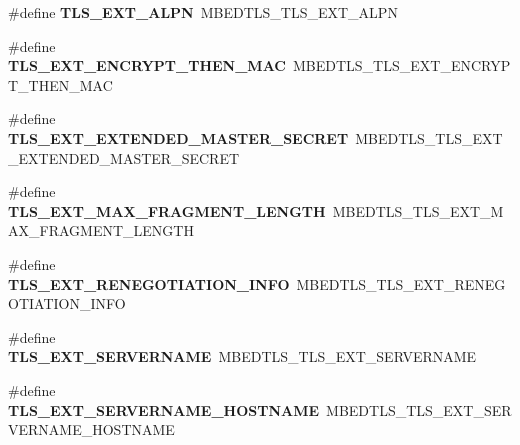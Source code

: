 \begin{DoxyCompactItemize}
\item 
\mbox{\label{compat-1_83_8h_a4b91900b335587d00420ed5a48e88e7d}} 
\#define {\bfseries T\+L\+S\+\_\+\+E\+X\+T\+\_\+\+A\+L\+PN}~M\+B\+E\+D\+T\+L\+S\+\_\+\+T\+L\+S\+\_\+\+E\+X\+T\+\_\+\+A\+L\+PN
\item 
\mbox{\label{compat-1_83_8h_ae136afe82bd9031a4c1c604de0cb0118}} 
\#define {\bfseries T\+L\+S\+\_\+\+E\+X\+T\+\_\+\+E\+N\+C\+R\+Y\+P\+T\+\_\+\+T\+H\+E\+N\+\_\+\+M\+AC}~M\+B\+E\+D\+T\+L\+S\+\_\+\+T\+L\+S\+\_\+\+E\+X\+T\+\_\+\+E\+N\+C\+R\+Y\+P\+T\+\_\+\+T\+H\+E\+N\+\_\+\+M\+AC
\item 
\mbox{\label{compat-1_83_8h_ac9dee2d05752c1b5385cabd27bd0beb4}} 
\#define {\bfseries T\+L\+S\+\_\+\+E\+X\+T\+\_\+\+E\+X\+T\+E\+N\+D\+E\+D\+\_\+\+M\+A\+S\+T\+E\+R\+\_\+\+S\+E\+C\+R\+ET}~M\+B\+E\+D\+T\+L\+S\+\_\+\+T\+L\+S\+\_\+\+E\+X\+T\+\_\+\+E\+X\+T\+E\+N\+D\+E\+D\+\_\+\+M\+A\+S\+T\+E\+R\+\_\+\+S\+E\+C\+R\+ET
\item 
\mbox{\label{compat-1_83_8h_aa7408a3622ebe264a5ef2c105a964cbd}} 
\#define {\bfseries T\+L\+S\+\_\+\+E\+X\+T\+\_\+\+M\+A\+X\+\_\+\+F\+R\+A\+G\+M\+E\+N\+T\+\_\+\+L\+E\+N\+G\+TH}~M\+B\+E\+D\+T\+L\+S\+\_\+\+T\+L\+S\+\_\+\+E\+X\+T\+\_\+\+M\+A\+X\+\_\+\+F\+R\+A\+G\+M\+E\+N\+T\+\_\+\+L\+E\+N\+G\+TH
\item 
\mbox{\label{compat-1_83_8h_ad0fbdb0804151f3a00631c342cf65957}} 
\#define {\bfseries T\+L\+S\+\_\+\+E\+X\+T\+\_\+\+R\+E\+N\+E\+G\+O\+T\+I\+A\+T\+I\+O\+N\+\_\+\+I\+N\+FO}~M\+B\+E\+D\+T\+L\+S\+\_\+\+T\+L\+S\+\_\+\+E\+X\+T\+\_\+\+R\+E\+N\+E\+G\+O\+T\+I\+A\+T\+I\+O\+N\+\_\+\+I\+N\+FO
\item 
\mbox{\label{compat-1_83_8h_a21bb5a4f093a191a4e3f0efae924dd7c}} 
\#define {\bfseries T\+L\+S\+\_\+\+E\+X\+T\+\_\+\+S\+E\+R\+V\+E\+R\+N\+A\+ME}~M\+B\+E\+D\+T\+L\+S\+\_\+\+T\+L\+S\+\_\+\+E\+X\+T\+\_\+\+S\+E\+R\+V\+E\+R\+N\+A\+ME
\item 
\mbox{\label{compat-1_83_8h_a948d249c0b07844056fdf68c640bb2ca}} 
\#define {\bfseries T\+L\+S\+\_\+\+E\+X\+T\+\_\+\+S\+E\+R\+V\+E\+R\+N\+A\+M\+E\+\_\+\+H\+O\+S\+T\+N\+A\+ME}~M\+B\+E\+D\+T\+L\+S\+\_\+\+T\+L\+S\+\_\+\+E\+X\+T\+\_\+\+S\+E\+R\+V\+E\+R\+N\+A\+M\+E\+\_\+\+H\+O\+S\+T\+N\+A\+ME

\end{DoxyCompactItemize}
